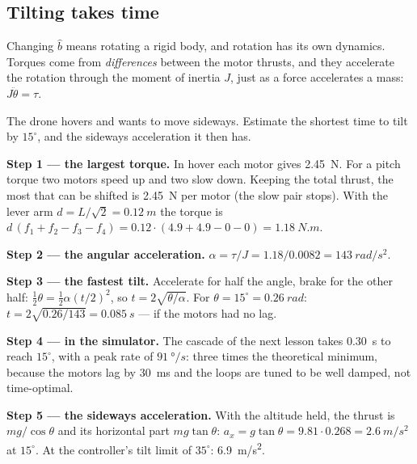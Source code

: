 
\subsection{Tilting takes time}
Changing $\hat b$ means rotating a rigid body, and rotation has its own dynamics. Torques come from \emph{differences} between the motor thrusts, and they accelerate the rotation through the moment of inertia $J$, just as a force accelerates a mass: $J\ddot\theta = \tau$.

\begin{example}
\label{ex:tilt-time}
The drone hovers and wants to move sideways. Estimate the shortest time to tilt by $15^\circ$, and the sideways acceleration it then has.

\textbf{Step 1 — the largest torque.} In hover each motor gives \SI{2.45}{N}. For a pitch torque two motors speed up and two slow down. Keeping the total thrust, the most that can be shifted is \SI{2.45}{N} per motor (the slow pair stops). With the lever arm $d = L/\sqrt2 = \SI{0.12}{m}$ the torque is $d\,(f_1 + f_2 - f_3 - f_4) = 0.12 \cdot (4.9 + 4.9 - 0 - 0) = \SI{1.18}{N.m}$.

\textbf{Step 2 — the angular acceleration.} $\alpha = \tau/J = 1.18/0.0082 = \SI{143}{rad/s^2}$.

\textbf{Step 3 — the fastest tilt.} Accelerate for half the angle, brake for the other half: $\tfrac12\theta = \tfrac12\alpha(t/2)^2$, so $t = 2\sqrt{\theta/\alpha}$. For $\theta = 15^\circ = \SI{0.26}{rad}$: $t = 2\sqrt{0.26/143} = \SI{0.085}{s}$ — if the motors had no lag.

\textbf{Step 4 — in the simulator.} The cascade of the next lesson takes \SI{0.30}{s} to reach $15^\circ$, with a peak rate of $\SI{91}{\degree/s}$: three times the theoretical minimum, because the motors lag by \SI{30}{ms} and the loops are tuned to be well damped, not time-optimal.

\textbf{Step 5 — the sideways acceleration.} With the altitude held, the thrust is $mg/\cos\theta$ and its horizontal part $mg\tan\theta$: $a_x = g\tan\theta = 9.81 \cdot 0.268 = \SI{2.6}{m/s^2}$ at $15^\circ$. At the controller's tilt limit of $35^\circ$: \SI{6.9}{m/s^2}.
\end{example}

